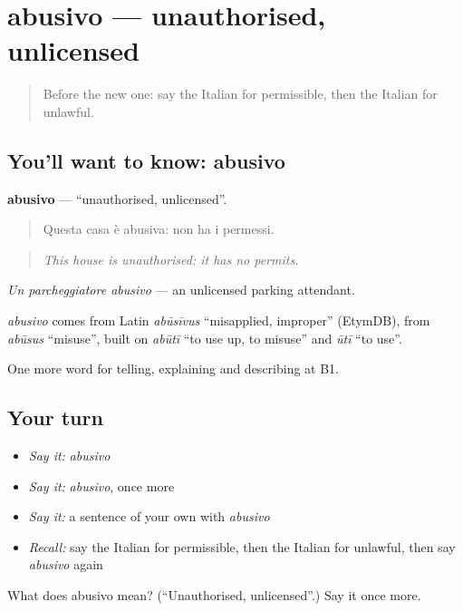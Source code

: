 \section[abusivo]{abusivo — unauthorised, unlicensed}

\label{lesson:IT-C390-abusivo}



\begin{quote}
Before the new one: say the Italian for permissible, then the Italian for unlawful.
\end{quote}

\subsection*{You'll want to know: abusivo}
\textbf{abusivo} — \textquotedblleft{}unauthorised, unlicensed\textquotedblright{}.

\begin{quote}
Questa casa è abusiva: non ha i permessi.
\end{quote}

\begin{quote}
\emph{This house is unauthorised: it has no permits.}
\end{quote}

\emph{Un parcheggiatore abusivo} — an unlicensed parking attendant.

\begin{cousinweb}
\emph{abusivo} comes from Latin \emph{abūsīvus} \textquotedblleft{}misapplied, improper\textquotedblright{} (EtymDB), from \emph{abūsus} \textquotedblleft{}misuse\textquotedblright{}, built on \emph{abūtī} \textquotedblleft{}to use up, to misuse\textquotedblright{} and \emph{ūtī} \textquotedblleft{}to use\textquotedblright{}.
\end{cousinweb}

\begin{grammarlens}[title={What you've built}]
One more word for telling, explaining and describing at B1.
\end{grammarlens}

\subsection*{Your turn}
\begin{itemize}
\raggedright
  \item \emph{Say it:} \emph{abusivo}
  \item \emph{Say it:} \emph{abusivo}, once more
  \item \emph{Say it:} a sentence of your own with \emph{abusivo}
  \item \emph{Recall:} say the Italian for permissible, then the Italian for unlawful, then say \emph{abusivo} again
\end{itemize}

\begin{tcolorbox}[breakable,colback=teal!4,colframe=teal!35!black,title={Before you move on}]
What does abusivo mean? (\textquotedblleft{}Unauthorised, unlicensed\textquotedblright{}.) Say it once more.
\end{tcolorbox}
